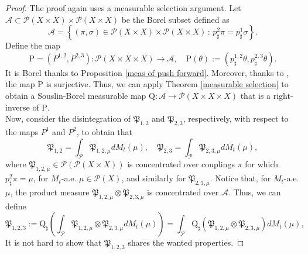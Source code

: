 \documentclass[10pt,leqno]{amsart}
\numberwithin{equation}{section}
\newcommand{\PP}{\mathcal{P}}
\begin{document}
\begin{proof}
    The proof again uses a measurable selection argument. Let $\mathcal{A}\subset\PP(X\times X)\times \PP(X\times X)$ be the Borel subset defined as 
    \[\mathcal{A} = \left\{(\pi,\sigma) \in \PP(X\times X) \times \PP(X\times X) \, : \, p^2_\sharp \pi=p^1_\sharp \sigma \right\}.\]
    Define the map 
    \[\mathrm{P} = (P^{1,2},P^{2,3}):\PP(X\times X \times X) \to \mathcal{A}, \quad \mathrm{P}(\theta):= (p^{1,2}_\sharp \theta, p^{2,3}_\sharp \theta).\]
    It is Borel thanks to Proposition \ref{meas of push forward}. Moreover, thanks to \cite[Lemma 5.3.2 \& Remark 5.3.3]{ambrosio2005gradient}, the map $\mathrm{P}$ is surjective. Thus, we can apply Theorem \ref{measurable selection} to obtain a Souslin-Borel measurable map $\mathrm{Q}:\mathcal{A}\to \PP(X\times X \times X)$ that is a right-inverse of $\mathrm{P}$.
    \\
    Now, consider the disintegration of $\mathfrak{P}_{1,2}$ and $\mathfrak{P}_{2,3}$, respectively, with respect to the maps $P^1$ and $P^2$, to obtain that
    \[\mathfrak{P}_{1,2} = \int_{\PP} \mathfrak{P}_{1,2,\mu} dM_t(\mu), \quad \mathfrak{P}_{2,3} = \int_{\PP} \mathfrak{P}_{2,3,\mu} dM_t(\mu),\]
    where $\mathfrak{P}_{1,2,\mu} \in \PP(\PP(X\times X))$ is concentrated over couplings $\pi$ for which $p^2_\sharp \pi = \mu$, for $M_t$-a.e. $\mu\in \PP(X)$, and similarly for $\mathfrak{P}_{2,3,\mu}$. Notice that, for $M_t$-a.e. $\mu$, the product measure $\mathfrak{P}_{1,2,\mu} \otimes \mathfrak{P}_{2,3,\mu} $ is concentrated over $\mathcal{A}$. Thus, we can define 
    \begin{equation}
        \mathfrak{P}_{1,2,3}:= \mathrm{Q}_\sharp \left( \int_\PP \mathfrak{P}_{1,2,\mu} \otimes \mathfrak{P}_{2,3,\mu} dM_t(\mu) \right) =  \int_\PP \mathrm{Q}_\sharp \left(\mathfrak{P}_{1,2,\mu} \otimes \mathfrak{P}_{2,3,\mu} \right) dM_t(\mu),
    \end{equation}
    It is not hard to show that $\mathfrak{P}_{1,2,3}$ shares the wanted properties.
\end{proof}
\end{document}
